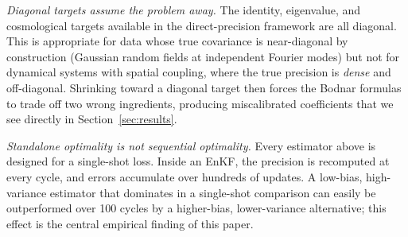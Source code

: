 \emph{Diagonal targets assume the problem away.} The identity, eigenvalue, and cosmological targets available in the direct-precision framework are all diagonal. This is appropriate for data whose true covariance is near-diagonal by construction (Gaussian random fields at independent Fourier modes) but not for dynamical systems with spatial coupling, where the true precision is \emph{dense} and off-diagonal. Shrinking toward a diagonal target then forces the Bodnar formulas to trade off two wrong ingredients, producing miscalibrated coefficients that we see directly in Section~\ref{sec:results}.

\emph{Standalone optimality is not sequential optimality.} Every estimator above is designed for a single-shot loss. Inside an EnKF, the precision is recomputed at every cycle, and errors accumulate over hundreds of updates. A low-bias, high-variance estimator that dominates in a single-shot comparison can easily be outperformed over 100 cycles by a higher-bias, lower-variance alternative; this effect is the central empirical finding of this paper.
